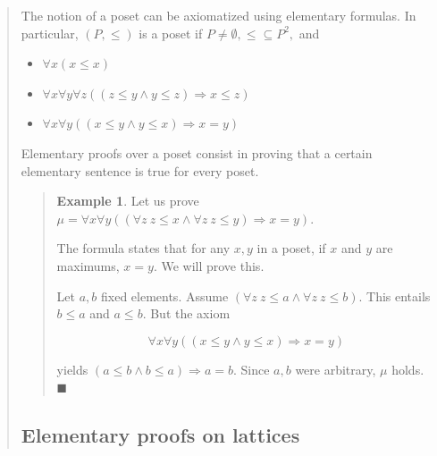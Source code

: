 \documentclass[a4paper, 12pt]{article}
\theoremstyle{definition}
\theoremstyle{definition}
\newtheorem{example}{Example}
\theoremstyle{definition}
\begin{document}
\begin{quote}
The notion of a poset can be axiomatized using elementary formulas. In
particular, $(P, \leq) $ is a poset if $P \neq \emptyset, \leq \subseteq P^2,$
and 

\begin{itemize}
    \item $\forall x(x\leq x)$
    \item $\forall x \forall y \forall z \left( \left( z \leq y \land  y \leq z \right) \Rightarrow x \leq z  \right) $
    \item $\forall x \forall y \left( \left( x \leq y \land  y \leq x \right) \Rightarrow x = y  \right) $
\end{itemize}

Elementary proofs over a poset consist in proving that a certain elementary 
sentence is true for every poset. 


\small
\begin{quote}

\begin{example}
    Let us prove $\mu = \forall x \forall  y \left( \left( \forall z ~ z \leq x \land \forall z ~ z \leq y \right) \Rightarrow x = y \right) $.

    The formula states that for any $x, y$ in a poset, if $x$ and $y$ are 
    maximums, $x = y$. We will prove this. 

    Let $a, b$ fixed elements. Assume $\left( \forall z ~ z \leq a \land \forall z ~ z \leq b \right) $.
    This entails $b \leq a$ and $a \leq b$. But the axiom 

    \begin{equation*}
        \forall x \forall y \left( \left( x \leq y \land  y \leq x \right) \Rightarrow x = y  \right)
    \end{equation*}

    yields $(a \leq b \land  b \leq a) \Rightarrow a = b$. Since $a, b$ were 
    arbitrary, $\mu$ holds. $\blacksquare$

\end{example}


\end{quote}
\normalsize


\subsection{Elementary proofs on lattices}


\end{quote}
\end{document}
